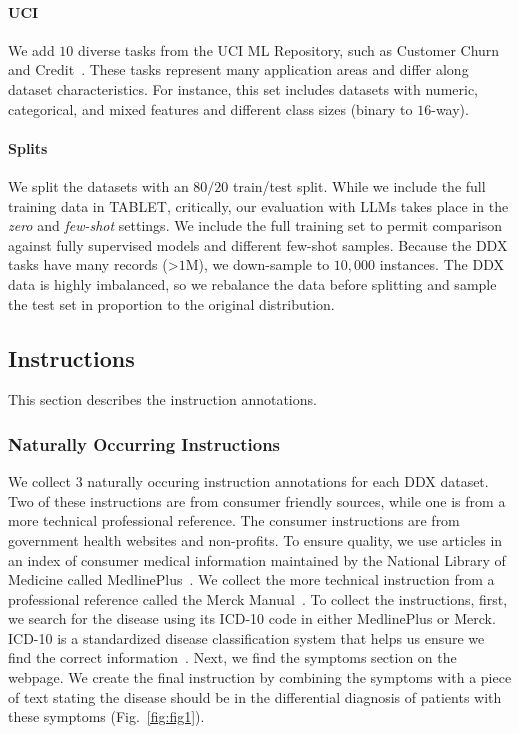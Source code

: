 \paragraph{UCI} We add $10$ diverse tasks from the UCI ML Repository, such as  Customer Churn and Credit~\cite{Dua:2019}. These tasks represent many application areas and differ along dataset characteristics. For instance, this set includes datasets with numeric, categorical, and mixed features and different class sizes (binary to $16$-way).

\paragraph{Splits} We split the datasets with an $80/20$ train/test split. While we include the full training data in TABLET, critically, our evaluation with LLMs takes place in the \textit{zero} and \textit{few-shot} settings. We include the full training set to permit comparison against fully supervised models and different few-shot samples. Because the DDX tasks have many records (>$1$M), we down-sample to $10,000$ instances. The DDX data is highly imbalanced, so we rebalance the data before splitting and sample the test set in proportion to the original distribution.

\subsection{Instructions}

This section describes the instruction annotations.

\subsubsection{Naturally Occurring Instructions} We collect $3$ naturally occuring instruction annotations for each DDX dataset. Two of these instructions are from consumer friendly sources, while one is from a more technical professional reference. The consumer instructions are from government health websites and non-profits. To ensure quality, we use articles in an index of consumer medical information maintained by the National Library of Medicine called MedlinePlus~\cite{medlineplus}. We collect the more technical instruction from a professional reference called the Merck Manual~\cite{Bullers2016}. To collect the instructions, first, we search for the disease using its ICD-10 code in either MedlinePlus or Merck. ICD-10 is a standardized disease classification system that helps us ensure we find the correct information~\cite{WHO1993}. Next, we find the symptoms section on the webpage. We create the final instruction by combining the symptoms with a piece of text stating the disease should be in the differential diagnosis of patients with these symptoms
(Fig.~\ref{fig:fig1}).

